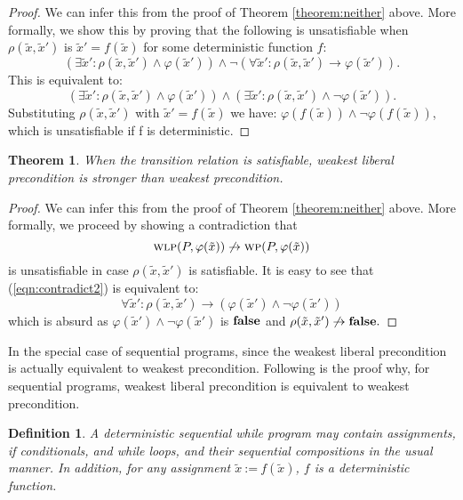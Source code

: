\documentclass[times]{elsarticle}
\newtheorem{theorem}{Theorem}
\newtheorem{definition}{Definition}
\newcommand{\passign}{\mbox{:=}}
\newcommand{\pfalse}{\mbox{\textbf{false}}}
\newcommand{\WP}{\mbox{\textsc{wp}}}
\newcommand{\WLP}{\mbox{\textsc{wlp}}}
\begin{document}
\begin{proof}
  We can infer this from the proof of Theorem \ref{theorem:neither}
  above.  More formally, we show this by proving that the following is
  unsatisfiable when $\rho(\tilde{x},\tilde{x}')$ is $\tilde{x}' = f(\tilde{x})$ for some
  deterministic function $f$:
\[
(\exists \tilde{x}' : \rho(\tilde{x},\tilde{x}') \wedge \varphi(\tilde{x}')) \wedge \neg(\forall \tilde{x}' :
\rho(\tilde{x},\tilde{x}') \rightarrow \varphi(\tilde{x}')). 
\]
This is equivalent to:
\[
(\exists \tilde{x}' : \rho(\tilde{x},\tilde{x}') \wedge \varphi(\tilde{x}')) \wedge (\exists \tilde{x}' :
\rho(\tilde{x},\tilde{x}') \wedge \neg\varphi(\tilde{x}')). 
\]
Substituting $\rho(\tilde{x},\tilde{x}')$ with $\tilde{x}'=f(\tilde{x})$ we have: $\varphi(f(\tilde{x}))
\wedge \neg\varphi(f(\tilde{x}))$, 
which is unsatisfiable if f is deterministic. 
\end{proof}

\begin{theorem} \label{theorem:wlpstronger}
  When the transition relation is satisfiable, weakest liberal 
  precondition is stronger than weakest precondition. 
\end{theorem}

\begin{proof}
We can infer this from the proof of Theorem \ref{theorem:neither}
above. More formally, we proceed by showing a contradiction that
\begin{equation} \label{eqn:contradict2}
\WLP(P, \varphi(\tilde{x})) \not\rightarrow
\WP(P, \varphi(\tilde{x}))
\end{equation}
is unsatisfiable in case $\rho(\tilde{x},\tilde{x}')$ is satisfiable.
It is easy to see that (\ref{eqn:contradict2}) is equivalent to:
\[
\forall \tilde{x}' : \rho(\tilde{x},\tilde{x}') \rightarrow (\varphi(\tilde{x}') \wedge \neg\varphi(\tilde{x}'))
\]
which is absurd as $\varphi(\tilde{x}') \wedge
\neg\varphi(\tilde{x}')$ is $\pfalse$ and
$\rho(\tilde{x},\tilde{x}') \not\rightarrow \pfalse.$
\end{proof}

In the special case of sequential programs, since the weakest liberal
precondition is actually equivalent to weakest precondition. Following
is the proof why, for sequential programs, weakest liberal
precondition is equivalent to weakest precondition.

\begin{definition}
  A deterministic sequential while program may contain assignments, if
  conditionals, and while loops, and their sequential compositions in
  the usual manner. In addition, for any assignment $\tilde{x} ~\passign~ f(\tilde{x})$, $f$
  is a deterministic function.
\end{definition}
\end{document}
